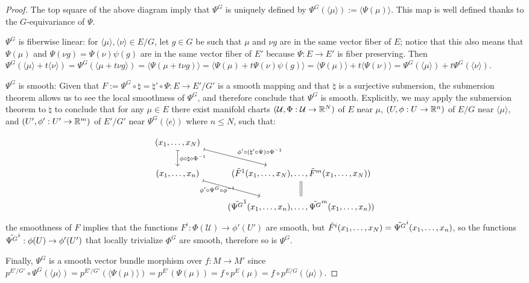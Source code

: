 \begin{proof}
The top square of the above diagram imply that $\Psi^{G}$ is uniquely defined by $\Psi^{G}(\langle \mu \rangle) := \langle \Psi(\mu) \rangle$. This map is well defined thanks to the $G$-equivariance of $\Psi$.

$\Psi^G$ is fiberwise linear: for $\langle \mu \rangle, \langle \nu \rangle \in E/G$, let $g \in G$ be such that $\mu$ and $\nu g$ are in the same vector fiber of $E$; notice that this also means that $\Psi(\mu)$ and $\Psi(\nu g) = \Psi(\nu) \psi(g)$ are in the same vector fiber of $E'$ because $\Psi:E \to E'$ is fiber preserving. 
Then $\Psi^{G}(\langle \mu \rangle + t\langle \nu \rangle) = \Psi^{G}(\langle \mu  + t \nu g \rangle)  = \langle \Psi(\mu + t \nu g ) \rangle = \langle \Psi(\mu) + t \Psi(\nu)\psi(g) \rangle = \langle \Psi(\mu) \rangle + t \langle \Psi(\nu) \rangle = \Psi^{G}(\langle \mu \rangle) + t\Psi^{G}(\langle \nu \rangle)$.

$\Psi^{G}$ is smooth: Given that $F := \Psi^{G} \circ \natural = \natural' \circ \Psi : E \to E'/G'$ is a smooth mapping and that $\natural$ is a surjective submersion, the submersion theorem allows us to see the local smoothness of $\Psi^{G}$, and therefore conclude that $\Psi^{G}$ is smooth. Explicitly, we may apply the submersion theorem to $\natural$  to conclude that for any $\mu \in E$ there exist manifold charts $(\mathcal U, \Phi: \mathcal U \to \mathbb{R}^N)$ of $E$ near $\mu$, $(U, \phi: U \to \RR^n)$ of $E/G$ near $\langle \mu \rangle$, and $(U', \phi': U' \to \RR^m)$ of $E'/G'$ near $\Psi^{G}(\langle e \rangle)$ where $n \leq N$, such that: %

\[
\begin{tikzcd}
    (x_1, \dots, x_N) \arrow[mapsto]{rd}{\phi' \circ (\natural' \circ \Psi) \circ \Phi^{-1} } \arrow[mapsto]{d}{\phi \circ \natural \circ \Phi^{-1}} & \\
    (x_1, \dots, x_n) \arrow[mapsto]{rd}[below, near start]{\phi' \circ \Psi^{G} \circ \phi^{-1}} & (\Tilde F^1(x_1, \dots, x_N), \dots, \Tilde F^m(x_1, \dots, x_N)) \arrow[equal]{d}\\
    & (\Tilde{\Psi^{G}}^1(x_1, \dots, x_n), \dots, \Tilde{\Psi^{G}}^m(x_1, \dots, x_n))
\end{tikzcd}
\]
the smoothness of $F$ implies that the functions $F^i:\Phi(\mathcal U) \to \phi'(U')$ are smooth, but $\Tilde F^i(x_1, \dots, x_N) = \Tilde{\Psi^{G}}^i(x_1, \dots, x_n)$, so the functions $\Tilde{\Psi^{G}}^i:\phi(U) \to \phi'(U')$ that locally trivialize $\Phi^{G}$ are smooth, therefore so is $\Psi^{G}$. 

Finally, $\Psi^{G}$ is a smooth vector bundle morphism over $f:M \to M'$ since $p^{E'/G'} \circ \Psi^{G}(\langle \mu \rangle) = p^{E'/G'}(\langle \Psi(\mu) \rangle) = p^{E'}(\Psi(\mu)) = f \circ p^E (\mu) = f \circ p^{E/G} (\langle \mu \rangle)$.

\end{proof}

